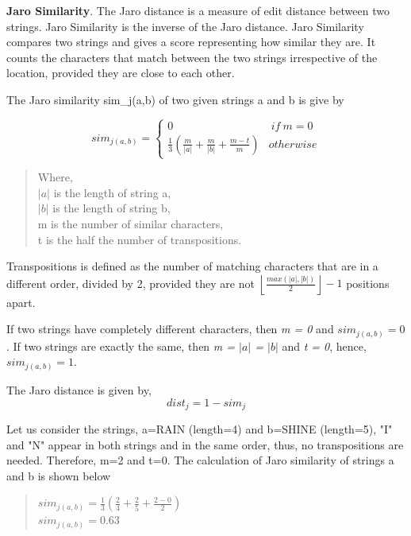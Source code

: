 \textbf{Jaro Similarity}. The Jaro distance is a measure of edit distance between two strings. Jaro Similarity is the inverse of the Jaro distance. Jaro Similarity compares two strings and gives a score representing how similar they are. It counts the characters that match between the two strings irrespective of the location, provided they are close to each other.

The Jaro similarity sim\_{j(a,b)} of two given strings a and b is give by

\begin{singlespace}
\begin{equation}
   sim_{j(a,b)} = \left\{ \begin{array}{cl}
0 & \ if \ m = 0 \\
\frac{1}{3} \left(  \frac{m}{|a|}+\frac{m}{|b|}+\frac{m-t}{m}\right)& otherwise
\end{array} \right. 
\end{equation}
\end{singlespace}

\begin{quote}
Where, \\
$|a|$ is the length of string a, \\
$|b|$ is the length of string b, \\
m is the number of similar characters, \\
t is the half the number of transpositions.
\end{quote}
Transpositions is defined as the number of matching characters
that are in a different order, divided by 2, provided they are not $\left\lfloor \frac{max(|a|,|b|)}{2} \right\rfloor - 1$ positions apart.

If two strings have completely different characters, then \textit{m = 0} and \textit{$sim_{j(a,b)} = 0$}.
If two strings are exactly the same, then 
\textit{m = $|a|$ = $|b|$} and \textit{t = 0}, hence, \textit{$sim_{j(a,b)} = 1$}.

The Jaro distance is given by,
\begin{equation}
    dist_{j}=1-sim_{j}
\end{equation}

Let us consider the strings, a=RAIN (length=4) and b=SHINE (length=5), "I" and "N" appear in both strings and in the same order, thus, no transpositions are needed. Therefore, m=2 and t=0. 
The calculation of Jaro similarity of strings a and b is shown below 
\begin{quote}
\centering
$sim_{j(a,b)}=\frac{1}{3} \left(  \frac{2}{4}+\frac{2}{5}+\frac{2-0}{2}\right)$ \\
$sim_{j(a,b)}=0.63$
\end{quote}


